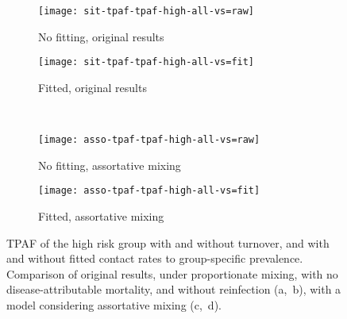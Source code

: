 \begin{figure}[!tbp]
  \centering
  \begin{subfigure}{0.35\linewidth}
    \centering\texttt{[image: sit-tpaf-tpaf-high-all-vs=raw]}
    \caption{No fitting, original results}
    \label{fig:tpaf-raw-app}
  \end{subfigure}
  \begin{subfigure}{0.35\linewidth}
    \centering\texttt{[image: sit-tpaf-tpaf-high-all-vs=fit]}
    \caption{Fitted, original results}
    \label{fig:tpaf-fit-app}
  \end{subfigure}\\
  \begin{subfigure}{0.35\linewidth}
    \centering\texttt{[image: asso-tpaf-tpaf-high-all-vs=raw]}
    \caption{No fitting, assortative mixing}
    \label{fig:tpaf-asso-raw}
  \end{subfigure}
  \begin{subfigure}{0.35\linewidth}
    \centering\texttt{[image: asso-tpaf-tpaf-high-all-vs=fit]}
    \caption{Fitted, assortative mixing}
    \label{fig:tpaf-asso-fit}
  \end{subfigure}
  \caption{TPAF of the high risk group with and without turnover,
    and with and without fitted contact rates to group-specific prevalence.
    Comparison of original results,
    under proportionate mixing,
    with no disease-attributable mortality,
    and without reinfection (a,~b),
    with a model considering
    assortative mixing (c,~d).}
  \label{fig:tpaf-app}
\end{figure}